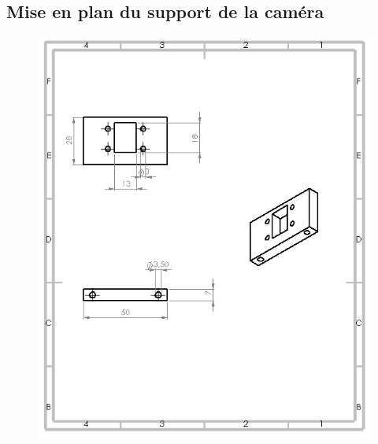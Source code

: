 \begin{changemargin}{-2cm}{-4cm}
\chapter*{Mise en plan du support de la caméra}
\begin{figure}[!h]
\label{supportcamera}
 \center
 \includegraphics[scale=0.95]{../3Dmodels/camera.png}
\end{figure}

\end{changemargin}